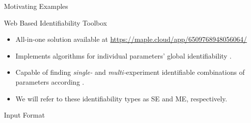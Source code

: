 \documentclass[final,hyperref={pdfpagelabels=false}]{beamer}
\begin{document}
\begin{frame}[t]
\begin{columns}[t]
\begin{column}{.465\textwidth}
\begin{block}{Motivating Examples}
            \end{block}


            \begin{block}{Web Based Identifiability Toolbox \cite{ilmer_web-based_2021}}

                \begin{itemize}
                    \item All-in-one solution available at \url{https://maple.cloud/app/6509768948056064/}
                    \item Implements algorithms for individual parameters' global identifiability \cite{hong_sian_2019}.
                    \item Capable of finding \emph{single-} and \emph{multi-}experiment identifiable combinations of parameters according \cite{ovchinnikov2020computing,ovchinnikov2020multi}.
                    \item We will refer to these identifiability types as SE and ME, respectively.
                \end{itemize} %

            \end{block}


            \begin{block}{Input Format}


\end{block}
\end{column}
\end{columns}
\end{frame}
\end{document}
